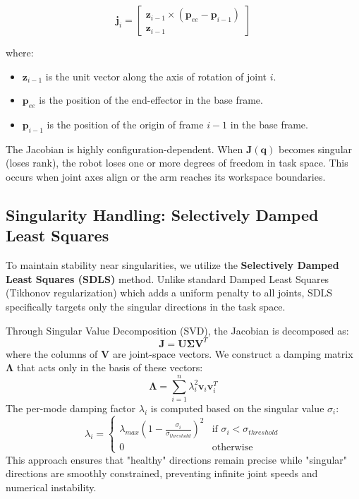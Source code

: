 \documentclass[12pt,a4paper]{report}
\begin{document}
\begin{equation}
    \mathbf{j}_i = \begin{bmatrix} \mathbf{z}_{i-1} \times (\mathbf{p}_{ee} - \mathbf{p}_{i-1}) \\ \mathbf{z}_{i-1} \end{bmatrix}
\end{equation}

where:
\begin{itemize}
    \item $\mathbf{z}_{i-1}$ is the unit vector along the axis of rotation of joint $i$.
    \item $\mathbf{p}_{ee}$ is the position of the end-effector in the base frame.
    \item $\mathbf{p}_{i-1}$ is the position of the origin of frame $i-1$ in the base frame.
\end{itemize}

The Jacobian is highly configuration-dependent. When $\mathbf{J}(\mathbf{q})$ becomes singular (loses rank), the robot loses one or more degrees of freedom in task space. This occurs when joint axes align or the arm reaches its workspace boundaries.

\subsection{Singularity Handling: Selectively Damped Least Squares}

To maintain stability near singularities, we utilize the \textbf{Selectively Damped Least Squares (SDLS)} method. Unlike standard Damped Least Squares (Tikhonov regularization) which adds a uniform penalty to all joints, SDLS specifically targets only the singular directions in the task space.

Through Singular Value Decomposition (SVD), the Jacobian is decomposed as:
\begin{equation}
    \mathbf{J} = \mathbf{U} \mathbf{\Sigma} \mathbf{V}^T
\end{equation}
where the columns of $\mathbf{V}$ are joint-space vectors. We construct a damping matrix $\mathbf{\Lambda}$ that acts only in the basis of these vectors:
\begin{equation}
    \mathbf{\Lambda} = \sum_{i=1}^{n} \lambda_i^2 \mathbf{v}_i \mathbf{v}_i^T
\end{equation}
The per-mode damping factor $\lambda_i$ is computed based on the singular value $\sigma_i$:
\begin{equation}
    \lambda_i = \begin{cases} 
    \lambda_{max} \left(1 - \frac{\sigma_i}{\sigma_{threshold}}\right)^2 & \text{if } \sigma_i < \sigma_{threshold} \\
    0 & \text{otherwise}
    \end{cases}
\end{equation}
This approach ensures that "healthy" directions remain precise while "singular" directions are smoothly constrained, preventing infinite joint speeds and numerical instability.
\end{document}
